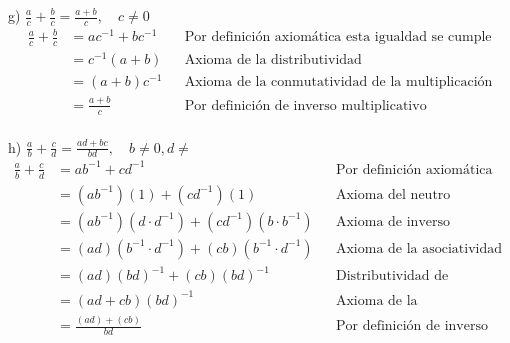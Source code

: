 \documentclass{article}
\begin{document}
\newpage
g) \quad \( \frac{a}{c} + \frac{b}{c} = \frac{a+b}{c}, \quad c\neq 0 \) \\
\begin{align*}
    \frac{a}{c} + \frac{b}{c} &= ac^{-1} + bc^{-1} && \text{Por definición axiomática esta igualdad se cumple} \\
    &= c^{-1}(a+b) && \text{Axioma de la distributividad} \\
    &= (a+b)c^{-1} && \text{Axioma de la conmutatividad de la multiplicación} \\
    &= \frac{a+b}{c} && \text{Por definición de inverso multiplicativo} \\
\end{align*}

h) \quad \( \frac{a}{b} + \frac{c}{d} = \frac{ad+bc}{bd}, \quad b\neq 0, d\neq \) \\
\begin{align*}
    \frac{a}{b} + \frac{c}{d} &= ab^{-1} + cd^{-1} && \text{Por definición axiomática esta igualdad se cumple} \\
    &= (ab^{-1})(1) + (cd^{-1})(1) && \text{Axioma del neutro multiplicativo} \\
    &= (ab^{-1})(d \cdot d^{-1}) + (cd^{-1})(b \cdot b^{-1}) && \text{Axioma de inverso multiplicativo} \\
    &= (ad)(b^{-1} \cdot d^{-1}) + (cb)(b^{-1} \cdot d^{-1}) && \text{Axioma de la asociatividad de la multiplicación} \\
    &= (ad)(bd)^{-1} + (cb)(bd)^{-1} && \text{Distributividad de potencias (teorema e)} \\
    &= (ad + cb)(bd)^{-1} && \text{Axioma de la distributividad} \\
    &= \frac{(ad) + (cb)}{bd} && \text{Por definición de inverso multiplicativo} \\
\end{align*}
\end{document}
